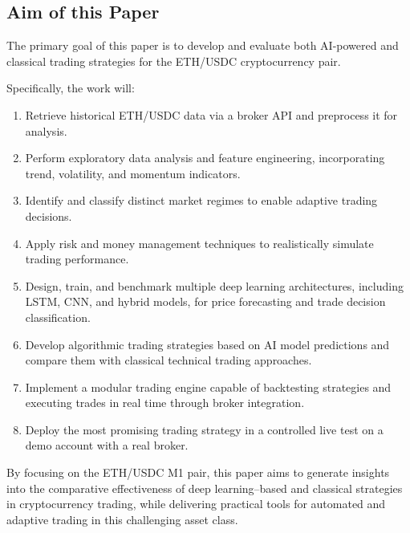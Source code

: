 \subsection{Aim of this Paper}


The primary goal of this paper is to develop and evaluate both AI-powered and classical trading strategies for the ETH/USDC cryptocurrency pair.

Specifically, the work will:


\begin{enumerate}

    \item Retrieve historical ETH/USDC data via a broker API and preprocess it for analysis.

    \item Perform exploratory data analysis and feature engineering, incorporating trend, volatility, and momentum indicators.

    \item Identify and classify distinct market regimes to enable adaptive trading decisions.

    \item Apply risk and money management techniques to realistically simulate trading performance.

    \item Design, train, and benchmark multiple deep learning architectures, including LSTM, CNN, and hybrid models, for price forecasting and trade decision classification.

    \item Develop algorithmic trading strategies based on AI model predictions and compare them with classical technical trading approaches.

    \item Implement a modular trading engine capable of backtesting strategies and executing trades in real time through broker integration.

    \item Deploy the most promising trading strategy in a controlled live test on a demo account with a real broker.

\end{enumerate}

\noindent
By focusing on the ETH/USDC M1 pair, this paper aims to generate insights into the comparative effectiveness of deep learning–based and classical strategies in cryptocurrency trading, while delivering practical tools for automated and adaptive trading in this challenging asset class.


